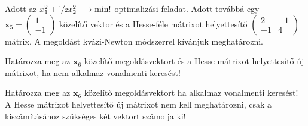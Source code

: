 \feladatszam Adott az $x_1^2+\nicefrac{1}{2}x_2^2\longrightarrow\min!$ optimalizási feladat. Adott továbbá egy $\mathbf{x}_5=\left(\begin{smallmatrix}1\\-1\end{smallmatrix}\right)$ közelítő vektor és a Hesse-féle mátrixot helyettesítő $\left(\begin{smallmatrix}2&-1\\-1&4\end{smallmatrix}\right)$ mátrix. A megoldást kvázi-Newton módszerrel kívánjuk meghatározni.
\begin{alphanumericlist}
\item Határozza meg az $\mathbf{x}_6$ közelítő megoldásvektort és a Hesse mátrixot helyettesítő új mátrixot, ha nem alkalmaz vonalmenti keresést!
\item Határozza meg az $\mathbf{x}_6$ közelítő megoldásvektort ha alkalmaz vonalmenti keresést! A Hesse mátrixot helyettesítő új mátrixot nem kell meghatározni, csak a kiszámításához szükséges két vektort számolja ki!
\end{alphanumericlist}

